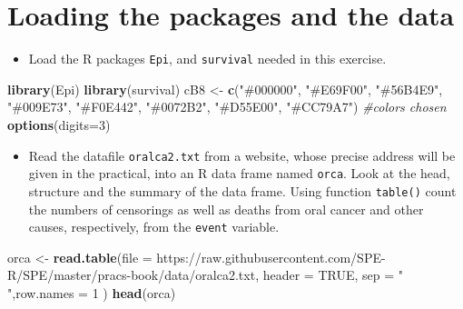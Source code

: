 \documentclass[
]{book}
\newenvironment{Shaded}{\begin{snugshade}}{\end{snugshade}}
\newcommand{\AttributeTok}[1]{\textcolor[rgb]{0.13,0.29,0.53}{#1}}
\newcommand{\CommentTok}[1]{\textcolor[rgb]{0.56,0.35,0.01}{\textit{#1}}}
\newcommand{\ConstantTok}[1]{\textcolor[rgb]{0.56,0.35,0.01}{#1}}
\newcommand{\DecValTok}[1]{\textcolor[rgb]{0.00,0.00,0.81}{#1}}
\newcommand{\FunctionTok}[1]{\textcolor[rgb]{0.13,0.29,0.53}{\textbf{#1}}}
\newcommand{\NormalTok}[1]{#1}
\newcommand{\OtherTok}[1]{\textcolor[rgb]{0.56,0.35,0.01}{#1}}
\newcommand{\StringTok}[1]{\textcolor[rgb]{0.31,0.60,0.02}{#1}}
\providecommand{\tightlist}{%
  \setlength{\itemsep}{0pt}\setlength{\parskip}{0pt}}
\theoremstyle{definition}
\theoremstyle{definition}
\theoremstyle{definition}
\theoremstyle{definition}
\theoremstyle{remark}
\begin{document}
\section{Loading the packages and the data}\label{loading-the-packages-and-the-data}

\begin{itemize}
\tightlist
\item
  Load the R packages \texttt{Epi}, and \texttt{survival} needed in this exercise.
\end{itemize}

\begin{Shaded}
\begin{Highlighting}[]
\FunctionTok{library}\NormalTok{(Epi)}
\FunctionTok{library}\NormalTok{(survival)}
\NormalTok{cB8  }\OtherTok{\textless{}{-}} \FunctionTok{c}\NormalTok{(}\StringTok{"\#000000"}\NormalTok{, }\StringTok{"\#E69F00"}\NormalTok{, }\StringTok{"\#56B4E9"}\NormalTok{, }\StringTok{"\#009E73"}\NormalTok{, }
          \StringTok{"\#F0E442"}\NormalTok{, }\StringTok{"\#0072B2"}\NormalTok{, }\StringTok{"\#D55E00"}\NormalTok{, }\StringTok{"\#CC79A7"}\NormalTok{) }\CommentTok{\#colors chosen}
\FunctionTok{options}\NormalTok{(}\AttributeTok{digits=}\DecValTok{3}\NormalTok{)}
\end{Highlighting}
\end{Shaded}

\begin{itemize}
\tightlist
\item
  Read the datafile \texttt{oralca2.txt} from a website, whose precise address
  will be given in the practical, into an R data frame named \texttt{orca}.
  Look at the head, structure and the summary of the data frame. Using
  function \texttt{table()} count the numbers of censorings as well as deaths
  from oral cancer and other causes, respectively, from the \texttt{event}
  variable.
\end{itemize}

\begin{Shaded}
\begin{Highlighting}[]
\NormalTok{orca }\OtherTok{\textless{}{-}}  \FunctionTok{read.table}\NormalTok{(}\AttributeTok{file =} \StringTok{\textquotesingle{}https://raw.githubusercontent.com/SPE{-}R/SPE/master/pracs{-}book/data/oralca2.txt\textquotesingle{}}\NormalTok{, }\AttributeTok{header =} \ConstantTok{TRUE}\NormalTok{, }\AttributeTok{sep =} \StringTok{" "}\NormalTok{,}\AttributeTok{row.names =} \DecValTok{1}\NormalTok{ )}
\FunctionTok{head}\NormalTok{(orca)}
\end{Highlighting}
\end{Shaded}
\end{document}
